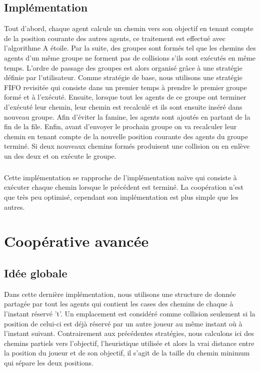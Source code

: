\documentclass[a4paper, twocolumn]{article}
\begin{document}
			\subsection{Implémentation}
			Tout d'abord, chaque agent calcule un chemin vers son objectif en tenant compte de la position courante des autres agents, ce traitement est effectué avec l'algorithme A étoile. Par la suite, des groupes sont formés tel que les chemins des agents d'un même groupe ne forment pas de collisions s'ils sont exécutés en même temps. 
			L'ordre de passage des groupes est alors organisé grâce à une stratégie définie par l'utilisateur. Comme stratégie de base, nous utilisons une stratégie FIFO revisitée qui consiste dans un premier temps à prendre le premier groupe formé et à l'exécuté. Ensuite, lorsque tout les agents de ce groupe ont terminer d'exécuté leur chemin, leur chemin est recalculé et ils sont ensuite inséré dans nouveau groupe. Afin d'éviter la famine, les agents sont ajoutés en partant de la fin de la file.
			Enfin, avant d'envoyer le prochain groupe on va recalculer leur chemin en tenant compte de la nouvelle position courante des agents du groupe terminé. Si deux nouveaux chemins formés produisent une collision on en enlève un des deux et on exécute le groupe.

			\subparagraph{}
			Cette implémentation se rapproche de l'implémentation naïve qui consiste à exécuter chaque chemin lorsque le précédent est terminé. La coopération n'est que très peu optimisé, cependant son implémentation est plus simple que les autres.

		\section{Coopérative avancée}

			\subsection{Idée globale}
			Dans cette dernière implémentation, nous utilisons une structure de donnée partagée par tout les agents qui contient les cases des chemins de chaque à l'instant réservé 't'. Un emplacement est considéré comme collision seulement si la position de celui-ci est déjà réservé par un autre joueur au même instant où à l'instant suivant. %
			Contrairement aux précédentes stratégies, nous calculons ici des chemins partiels vers l'objectif, l'heuristique utilisée et alors la vrai distance entre la position du joueur et de son objectif, il s'agit de la taille du chemin minimum qui sépare les deux positions. 
\end{document}
